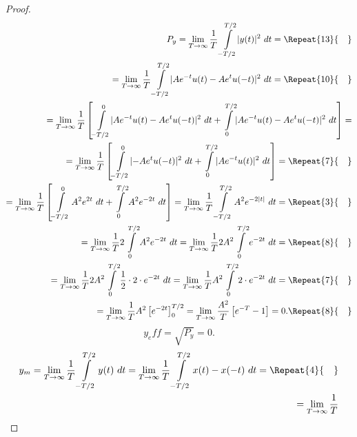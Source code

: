 \documentclass[12pt,oneside,openany]{memoir}
\numberwithin{equation}{subsection}
\DeclarePairedDelimiter{\abs}{\lvert}{\rvert}
\newcommand{\quads}[1]{\Repeat{#1}{\quad}}
\newcommand{\dt}{\ dt}
\begin{document}
\begin{proof}
\begin{equation}
\begin{split}
	P_y = \lim_{T \rightarrow \infty} \frac{1}{T}
	\int\displaylimits_{-T/2}^{T/2} \abs{y(t)}^2 \dt = 
	\quads{13}
	\\
	= \lim_{T \rightarrow \infty} \frac{1}{T}
	\int\displaylimits_{-T/2}^{T/2} \abs{A e^{-t} u(t) - A e^t u(-t)}^2
	\dt =
	\quads{10}
	\\
	= \lim_{T \rightarrow \infty} \frac{1}{T} \left[
		\int\displaylimits_{-T/2}^{0} \abs{A e^{-t} u(t) -
		A e^t u(-t)}^2 \dt + \int\displaylimits_{0}^{T/2}
		\abs{A e^{-t} u(t) - A e^t u(-t)}^2 \dt
	\right] =
	\\
	= \lim_{T \rightarrow \infty} \frac{1}{T} \left[
		\int\displaylimits_{-T/2}^{0} \abs{- A e^t u(-t)}^2 \dt +
		\int\displaylimits_{0}^{T/2} \abs{A e^{-t} u(t)}^2 \dt
	\right] =
	\quads{7}
	\\
	= \lim_{T \rightarrow \infty} \frac{1}{T} \left[
		\int\displaylimits_{-T/2}^{0} A^2 e^{2t} \dt + 
		\int\displaylimits_{0}^{T/2} A^2 e^{-2t} \dt
	\right] =
	\lim_{T \rightarrow \infty} \frac{1}{T} \int\displaylimits_{-T/2}^{T/2}
	A^2 e^{-2\abs{t}} \dt =
	\quads{3}
	\\
	= \lim_{T \rightarrow \infty} \frac{1}{T} 2 \int\displaylimits_{0}^{T/2}
	A^2 e^{-2t} \dt = \lim_{T \rightarrow \infty} \frac{1}{T} 2 A^2
	\int\displaylimits_{0}^{T/2} e^{-2t} \dt =
	\quads{8}
	\\
	= \lim_{T \rightarrow \infty} \frac{1}{T} 2 A^2
	\int\displaylimits_{0}^{T/2} \frac{1}{2} \cdot 2 \cdot e^{-2t} \dt =
	\lim_{T \rightarrow \infty} \frac{1}{T} A^2 \int\displaylimits_{0}^{T/2}
	2 \cdot e^{-2t} \dt =
	\quads{7}
	\\
	= \lim_{T \rightarrow \infty} \frac{1}{T} A^2 \left[
		e^{-2t}\right]_0^{T/2} = \lim_{T \rightarrow \infty}
		\frac{A^2}{T} \left[e^{-T} - 1\right] = 0.
	\quads{8}
\end{split}
\end{equation}
\begin{equation}
	y_eff = \sqrt{P_y} = 0.
\end{equation}
\begin{equation}
\begin{split}
	y_m = \lim_{T \rightarrow \infty} \frac{1}{T}
	\int\displaylimits_{-T/2}^{T/2} y(t) \dt = \lim_{T \rightarrow \infty}
	\frac{1}{T} \int\displaylimits_{-T/2}^{T/2} x(t) - x(-t) \dt =
	\quads{4}
	\\
	= \lim_{T \rightarrow \infty} \frac{1}{T}

\end{split}
\end{equation}
\end{proof}
\end{document}
